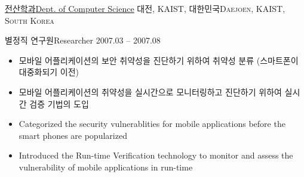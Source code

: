\documentclass[english,full]{resume_structure}
\begin{document}
\begin{Work}
{{\begin{itemize}
    \end{itemize}
    }
}
\ResumeSectionWithSubSection %
{\href{http://cs.kaist.ac.kr}{전산학과}}{\href{http://cs.kaist.ac.kr}{Dept. of Computer Science}}
{\textsc{대전, KAIST, 대한민국}}{\textsc{Daejoen, KAIST, South Korea}} {
  \ResumeSubSection %
    {별정직 연구원}{Researcher}
    {2007.03 -- 2007.08}
    {
    \begin{itemize}
      \item 모바일 어플리케이션의 보안 취약성을 진단하기 위하여 취약성 분류 (스마트폰이 대중화되기 이전)
      \item 모바일 어플리케이션의 취약성을 실시간으로 모니터링하고 진단하기 위하여 실시간 검증 기법의 도입
    \end{itemize}
    }
    {
    \begin{itemize}
      \item Categorized the security vulnerablities for mobile applications before the smart phones are popularized 
      \item Introduced the Run-time Verification technology to monitor and assess the vulnerability of mobile applications in run-time
    \end{itemize}
    }
}
\end{Work}

\end{document}

